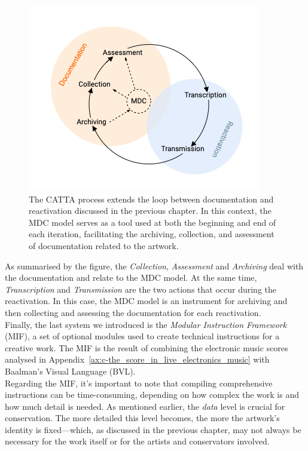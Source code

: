 \begin{figure}[!h]
    \centering
    \includegraphics[width=0.8\linewidth]{chapters/3-mdc_model-reactivation_workflow-instruction_template/image/graph03-mdc-catta.png}
    \caption{The CATTA process extends the loop between documentation and reactivation discussed in the previous chapter. In this context, the MDC model serves as a tool used at both the beginning and end of each iteration, facilitating the archiving, collection, and assessment of documentation related to the artwork.}
    \label{fig:c3-mdc-catta}
\end{figure}

As summarised by the figure, the \textit{Collection}, \textit{Assessment} and \textit{Archiving} deal with the documentation and relate to the MDC model. At the same time, \textit{Transcription} and \textit{Transmission} are the two actions that occur during the reactivation. In this case, the MDC model is an instrument for archiving and then collecting and assessing the documentation for each reactivation.\\
Finally, the last system we introduced is the \textit{Modular Instruction Framework} (MIF), a set of optional modules used to create technical instructions for a creative work. The MIF is the result of combining the electronic music scores analysed in Appendix~\ref{ax:c-the_score_in_live_electronics_music} with Baalman’s Visual Language (BVL).\\
Regarding the MIF, it’s important to note that compiling comprehensive instructions can be time-consuming, depending on how complex the work is and how much detail is needed. As mentioned earlier, the \textit{data} level is crucial for conservation. The more detailed this level becomes, the more the artwork’s identity is fixed—which, as discussed in the previous chapter, may not always be necessary for the work itself or for the artists and conservators involved.


